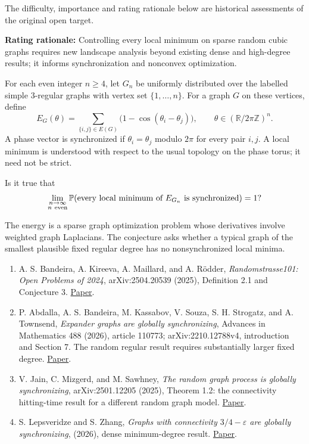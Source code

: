 \documentclass[11pt,a4paper]{article}
\makeatletter
\providecommand{\tightlist}{\setlength{\itemsep}{0pt}\setlength{\parskip}{0pt}}
\renewcommand{\subsection}{\Needspace{4\baselineskip}\@startsection{subsection}{2}{0pt}{9pt plus 1pt minus 1pt}{3pt}{\sffamily\bfseries\normalsize\color{ink}}}
\makeatother
\begin{document}
The difficulty, importance and rating rationale below are historical
assessments of the original open target.

\textbf{Rating rationale:} Controlling every local minimum on sparse
random cubic graphs requires new landscape analysis beyond existing
dense and high-degree results; it informs synchronization and nonconvex
optimization.

For each even integer \(n\geq4\), let \(G_n\) be uniformly distributed
over the labelled simple \(3\)-regular graphs with vertex set
\(\{1,\ldots,n\}\). For a graph \(G\) on these vertices, define \[
E_G(\theta)=
\sum_{\{i,j\}\in E(G)}
\bigl(1-\cos(\theta_i-\theta_j)\bigr),
\qquad
\theta\in(\mathbb R/2\pi\mathbb Z)^n.
\] A phase vector is synchronized if \(\theta_i=\theta_j\) modulo
\(2\pi\) for every pair \(i,j\). A local minimum is understood with
respect to the usual topology on the phase torus; it need not be strict.

Is it true that \[
\lim_{\substack{n\to\infty\\ n\ {\rm even}}}
\mathbb P\!\left(
\text{every local minimum of }E_{G_n}
\text{ is synchronized}
\right)=1?
\]

The energy is a sparse graph optimization problem whose derivatives
involve weighted graph Laplacians. The conjecture asks whether a typical
graph of the smallest plausible fixed regular degree has no
nonsynchronized local minima.

\newpage
\subsection{References}\label{references}

\begin{enumerate}
\def\labelenumi{\arabic{enumi}.}
\tightlist
\item
  A. S. Bandeira, A. Kireeva, A. Maillard, and A. Rödder,
  \emph{Randomstrasse101: Open Problems of 2024}, arXiv:2504.20539
  (2025), Definition 2.1 and Conjecture 3.
  \href{https://arxiv.org/html/2504.20539v1}{Paper}.
\item
  P. Abdalla, A. S. Bandeira, M. Kassabov, V. Souza, S. H. Strogatz, and
  A. Townsend, \emph{Expander graphs are globally synchronizing},
  Advances in Mathematics 488 (2026), article 110773;
  arXiv:2210.12788v4, introduction and Section 7. The random regular
  result requires substantially larger fixed degree.
  \href{https://arxiv.org/abs/2210.12788}{Paper}.
\item
  V. Jain, C. Mizgerd, and M. Sawhney, \emph{The random graph process is
  globally synchronizing}, arXiv:2501.12205 (2025), Theorem 1.2: the
  connectivity hitting-time result for a different random graph model.
  \href{https://arxiv.org/abs/2501.12205}{Paper}.
\item
  S. Lepsveridze and S. Zhang, \emph{Graphs with connectivity
  \(3/4-\varepsilon\) are globally synchronizing}, (2026), dense
  minimum-degree result. \href{https://arxiv.org/abs/2608.20010}{Paper}.
\end{enumerate}
\end{document}
